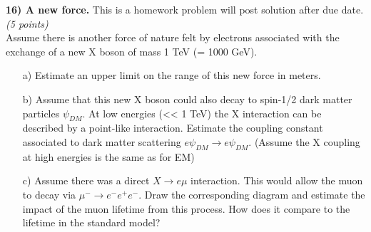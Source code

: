 {\textbf{16) A new force. } This is a homework problem will post solution after due date.\hfill \textit{(5 points)}\\
Assume there is another force of nature felt by electrons associated with the exchange of a new X boson of mass 1 TeV (= 1000 GeV).
\begin{itemize}
\item[a)]{ Estimate an upper limit on the range of this new force in meters.
\vspace{2in}
}
\item[b)]{ Assume that this new X boson could also decay to spin-1/2 dark matter particles $\psi_{DM}$. At low energies (<< 1 TeV) the X interaction can be described by a point-like interaction. Estimate the coupling constant associated to dark matter scattering $e \psi_{DM} \rightarrow e \psi_{DM}$.   (Assume the X coupling at high energies is the same as for EM)  }
\vspace*{2in}
\item[c)]{ Assume there was a direct $X\rightarrow e\mu$ interaction. This would allow the muon to decay via $\mu^- \rightarrow e^-e^+e^-$. Draw the corresponding diagram and estimate the impact of the muon lifetime from this process.  How does it compare to the lifetime in the standard model?     }
\end{itemize}






} %

